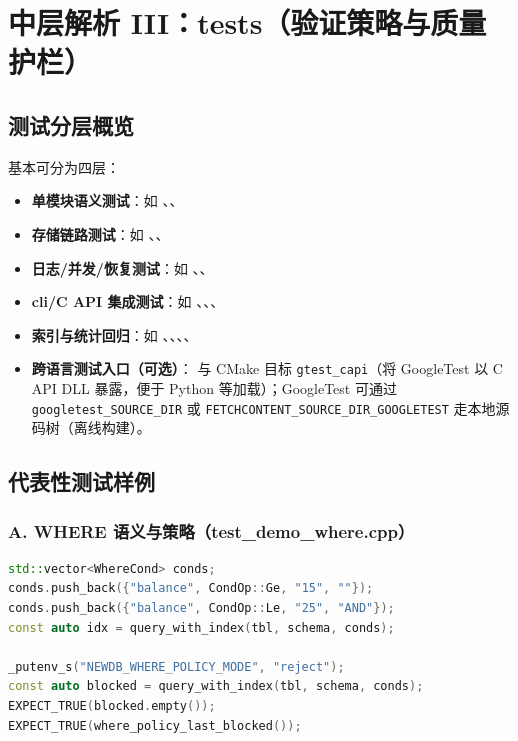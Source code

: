 \section{中层解析 III：tests（验证策略与质量护栏）}

\subsection{测试分层概览}

 基本可分为四层：

\begin{itemize}
  \item \textbf{单模块语义测试}：如 、、
  \item \textbf{存储链路测试}：如 、、
  \item \textbf{日志/并发/恢复测试}：如 、、
  \item \textbf{cli/C API 集成测试}：如 、、、
  \item \textbf{索引与统计回归}：如 、、、、
  \item \textbf{跨语言测试入口（可选）}： 与 CMake 目标 \texttt{gtest\_capi}（将 GoogleTest 以 C API DLL 暴露，便于 Python 等加载）；GoogleTest 可通过 \texttt{googletest\_SOURCE\_DIR} 或 \texttt{FETCHCONTENT\_SOURCE\_DIR\_GOOGLETEST} 走本地源码树（离线构建）。
\end{itemize}

\subsection{代表性测试样例}

\subsubsection{A. WHERE 语义与策略（test\_demo\_where.cpp）}
\begin{lstlisting}[language=C++,caption={WHERE 多条件与策略拒绝（节选）}]
std::vector<WhereCond> conds;
conds.push_back({"balance", CondOp::Ge, "15", ""});
conds.push_back({"balance", CondOp::Le, "25", "AND"});
const auto idx = query_with_index(tbl, schema, conds);

_putenv_s("NEWDB_WHERE_POLICY_MODE", "reject");
const auto blocked = query_with_index(tbl, schema, conds);
EXPECT_TRUE(blocked.empty());
EXPECT_TRUE(where_policy_last_blocked());
\end{lstlisting}

